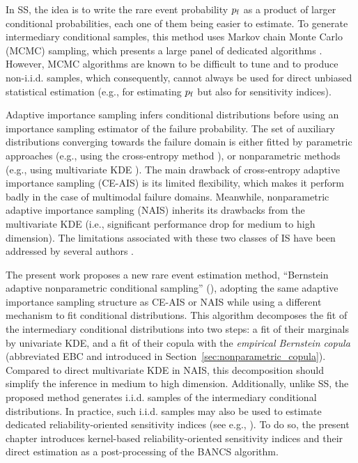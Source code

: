 In SS, the idea is to write the rare event probability $p_\mathrm{f}$ as a product of larger conditional probabilities, each one of them being easier to estimate. 
To generate intermediary conditional samples, this method uses Markov chain Monte Carlo (MCMC) sampling, which presents a large panel of dedicated algorithms \citep{Papaioannou_PEM_2015}. 
However, MCMC algorithms are known to be difficult to tune and to produce non-i.i.d. samples, which consequently, cannot always be used for direct unbiased statistical estimation (e.g., for estimating $p_\mathrm{f}$ but also for sensitivity indices). 

Adaptive importance sampling infers conditional distributions before using an importance sampling estimator of the failure probability. 
The set of auxiliary distributions converging towards the failure domain is either fitted by parametric approaches (e.g., using the cross-entropy method \citealp{rubinstein_2004_CE}), or nonparametric methods (e.g., using multivariate KDE \citealp{zhang_1996_NIS, Morio_RESS_2011}). 
The main drawback of cross-entropy adaptive importance sampling (CE-AIS) is its limited flexibility, which makes it perform badly in the case of multimodal failure domains. 
Meanwhile, nonparametric adaptive importance sampling (NAIS) inherits its drawbacks from the multivariate KDE (i.e., significant performance drop for medium to high dimension). 
The limitations associated with these two classes of IS have been addressed by several authors \citep{kurtz_song_2013_aisce,papaioannou_2016, geyer_2019_aisce, uribe_2021_aisce}.

The present work proposes a new rare event estimation method, ``Bernstein adaptive nonparametric conditional sampling'' (), adopting the same adaptive importance sampling structure as CE-AIS or NAIS while using a different mechanism to fit conditional distributions. 
This algorithm decomposes the fit of the intermediary conditional distributions into two steps: a fit of their marginals by univariate KDE, and a fit of their copula with the \emph{empirical Bernstein copula} (abbreviated EBC and introduced in Section~\ref{sec:nonparametric_copula}). 
Compared to direct multivariate KDE in NAIS, this decomposition should simplify the inference in medium to high dimension. 
Additionally, unlike SS, the proposed method generates i.i.d. samples of the intermediary conditional distributions. 
In practice, such i.i.d. samples may also be used to estimate dedicated reliability-oriented sensitivity indices (see e.g., \citealp{chabridon2021global,marrel_chabridon_2021}). 
To do so, the present chapter introduces kernel-based reliability-oriented sensitivity indices and their direct estimation as a post-processing of the BANCS algorithm. 

